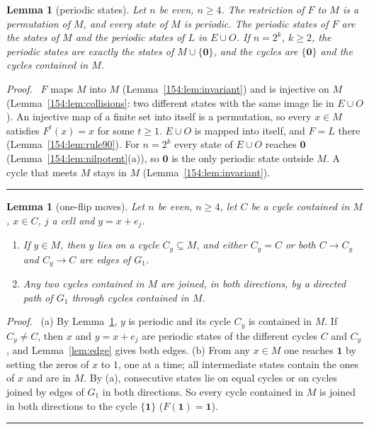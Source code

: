 \documentclass[10pt,a4paper]{article}
\newtheorem{lemma}[theorem]{Lemma}
\newcommand{\qedmark}{\rule{1.1ex}{1.1ex}}
\newenvironment{proof}[1][Proof]{\par\smallskip\noindent\textit{#1.}\ }{\hfill\qedmark\par\smallskip}
\newcommand{\zero}{\mathbf{0}}                %
\newcommand{\one}{\mathbf{1}}                 %
\newcommand{\Gone}{G_1}                       %
\begin{document}
\begin{lemma}[periodic states]\label{154:lem:periodic}
Let $n$ be even, $n\ge 4$. The restriction of $F$ to $M$ is a permutation of $M$, and every state of $M$ is
periodic. The periodic states of $F$ are the states of $M$ and the periodic states of $L$ in $E\cup O$. If $n=2^k$,
$k\ge 2$, the periodic states are exactly the states of $M\cup\{\zero\}$, and the cycles are $\{\zero\}$ and the
cycles contained in $M$.
\end{lemma}
\begin{proof}
$F$ maps $M$ into $M$ (Lemma~\ref{154:lem:invariant}) and is injective on $M$ (Lemma~\ref{154:lem:collisions}: two
different states with the same image lie in $E\cup O$). An injective map of a finite set into itself is a
permutation, so every $x\in M$ satisfies $F^t(x)=x$ for some $t\ge 1$. $E\cup O$ is mapped into itself, and
$F=L$ there (Lemma~\ref{154:lem:rule90}). For $n=2^k$ every state of $E\cup O$ reaches $\zero$
(Lemma~\ref{154:lem:nilpotent}(a)), so $\zero$ is the only periodic state outside $M$. A cycle that meets $M$ stays
in $M$ (Lemma~\ref{154:lem:invariant}).
\end{proof}

\begin{lemma}[one-flip moves]\label{154:lem:moves}
Let $n$ be even, $n\ge 4$, let $C$ be a cycle contained in $M$, $x\in C$, $j$ a cell and $y=x+e_j$.
\begin{enumerate}[label=\textup{(\alph*)},nosep,leftmargin=2.2em]
\item If $y\in M$, then $y$ lies on a cycle $C_y\subseteq M$, and either $C_y=C$ or both $C\to C_y$ and
$C_y\to C$ are edges of $\Gone$.
\item Any two cycles contained in $M$ are joined, in both directions, by a directed path of $\Gone$ through cycles
contained in $M$.
\end{enumerate}
\end{lemma}
\begin{proof}
(a) By Lemma~\ref{154:lem:periodic}, $y$ is periodic and its cycle $C_y$ is contained in $M$. If $C_y\neq C$, then
$x$ and $y=x+e_j$ are periodic states of the different cycles $C$ and $C_y$, and Lemma~\ref{lem:edge} gives both
edges.
(b) From any $x\in M$ one reaches $\one$ by setting the zeros of $x$ to $1$, one at a time; all intermediate states
contain the ones of $x$ and are in $M$. By (a), consecutive states lie on equal cycles or on cycles joined by edges
of $\Gone$ in both directions. So every cycle contained in $M$ is joined in both directions to the cycle $\{\one\}$
($F(\one)=\one$).
\end{proof}
\end{document}
